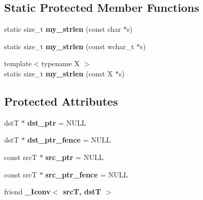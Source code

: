 \subsection*{Static Protected Member Functions}
\begin{DoxyCompactItemize}
\item 
\hypertarget{class__IconvBase_a59942f22d0735b2efc9760f6c6af6eaa}{static size\-\_\-t {\bfseries my\-\_\-strlen} (const char $\ast$s)}\label{class__IconvBase_a59942f22d0735b2efc9760f6c6af6eaa}

\item 
\hypertarget{class__IconvBase_a34e86742a8a9793cdf465bfb83907a83}{static size\-\_\-t {\bfseries my\-\_\-strlen} (const wchar\-\_\-t $\ast$s)}\label{class__IconvBase_a34e86742a8a9793cdf465bfb83907a83}

\item 
\hypertarget{class__IconvBase_a502c66b6a9a9931c254d428bfe8eeb80}{{\footnotesize template$<$typename X $>$ }\\static size\-\_\-t {\bfseries my\-\_\-strlen} (const X $\ast$s)}\label{class__IconvBase_a502c66b6a9a9931c254d428bfe8eeb80}

\end{DoxyCompactItemize}
\subsection*{Protected Attributes}
\begin{DoxyCompactItemize}
\item 
\hypertarget{class__IconvBase_a270820579d56ecaea184558e02adc223}{dst\-T $\ast$ {\bfseries dst\-\_\-ptr} = N\-U\-L\-L}\label{class__IconvBase_a270820579d56ecaea184558e02adc223}

\item 
\hypertarget{class__IconvBase_aa8d5c19c830379bb0c444e0670ec8563}{dst\-T $\ast$ {\bfseries dst\-\_\-ptr\-\_\-fence} = N\-U\-L\-L}\label{class__IconvBase_aa8d5c19c830379bb0c444e0670ec8563}

\item 
\hypertarget{class__IconvBase_a94abad0bc45ec272f1fd4fb8a04454fd}{const src\-T $\ast$ {\bfseries src\-\_\-ptr} = N\-U\-L\-L}\label{class__IconvBase_a94abad0bc45ec272f1fd4fb8a04454fd}

\item 
\hypertarget{class__IconvBase_aa8951f9f61d96c2a85e7dc496393ba51}{const src\-T $\ast$ {\bfseries src\-\_\-ptr\-\_\-fence} = N\-U\-L\-L}\label{class__IconvBase_aa8951f9f61d96c2a85e7dc496393ba51}

\item 
\hypertarget{class__IconvBase_ae589184e65d0add0c22795faa6720ac6}{friend {\bfseries \-\_\-\-Iconv$<$ src\-T, dst\-T $>$}}\label{class__IconvBase_ae589184e65d0add0c22795faa6720ac6}

\end{DoxyCompactItemize}


